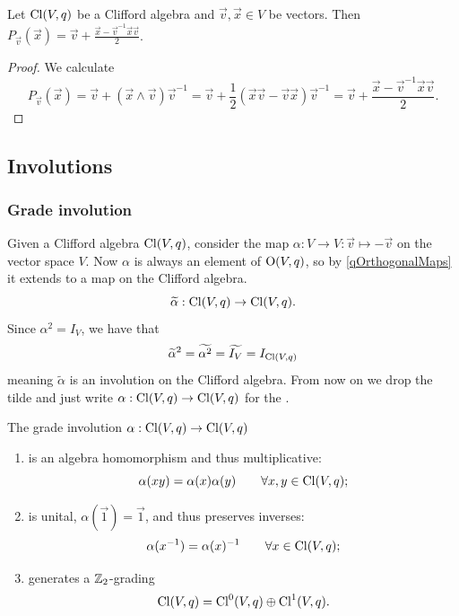 \begin{lemma}
Let $\operatorname{Cl}(V,q)$ be a Clifford algebra and $\vec{v},\vec{x}\in V$ be vectors. Then $P_{\vec{v}}(\vec{x}) = \vec{v} + \frac{\vec{x} - \vec{v}^{-1}\vec{x}\vec{v}}{2}$.
\end{lemma}
\begin{proof}
We calculate
\[ P_{\vec{v}}(\vec{x}) = \vec{v} + (\vec{x}\wedge \vec{v})\vec{v}^{-1} = \vec{v} + \frac{1}{2}(\vec{x}\vec{v} - \vec{v}\vec{x})\vec{v}^{-1} = \vec{v} + \frac{\vec{x} - \vec{v}^{-1}\vec{x}\vec{v}}{2}. \]
\end{proof}

\subsection{Involutions}
\subsubsection{Grade involution}
Given a Clifford algebra $\operatorname{Cl}(V,q)$, consider the map $\alpha: V \to V: \vec{v}\mapsto -\vec{v}$ on the vector space $V$.
Now $\alpha$ is always an element of $\operatorname{O}(V,q)$, so by \ref{qOrthogonalMaps} it extends to a map on the Clifford algebra.
\[ \widetilde{\alpha}: \operatorname{Cl}(V,q) \to \operatorname{Cl}(V,q). \]
Since $\alpha^2 = I_V$, we have that
\[ \widetilde{\alpha}^2 = \widetilde{\alpha^2} = \widetilde{I_V} = I_{\operatorname{Cl}(V,q)} \]
meaning $\widetilde{\alpha}$ is an involution on the Clifford algebra. From now on we drop the tilde and just write $\alpha: \operatorname{Cl}(V,q) \to \operatorname{Cl}(V,q)$ for the .

\begin{lemma}
The grade involution $\alpha: \operatorname{Cl}(V,q) \to \operatorname{Cl}(V,q)$
\begin{enumerate}
\item is an algebra homomorphism and thus multiplicative:
\[ \alpha(xy) = \alpha(x)\alpha(y) \qquad\forall x,y\in \operatorname{Cl}(V,q); \]
\item is unital, $\alpha(\vec{1}) = \vec{1}$, and thus preserves inverses:
\[ \alpha(x^{-1}) = \alpha(x)^{-1} \qquad\forall x\in \operatorname{Cl}(V,q); \]
\item generates a $\mathbb{Z}_2$-grading 
\[ \operatorname{Cl}(V,q) = \operatorname{Cl}^0(V,q)\oplus \operatorname{Cl}^1(V,q). \]
\end{enumerate}
\end{lemma}

